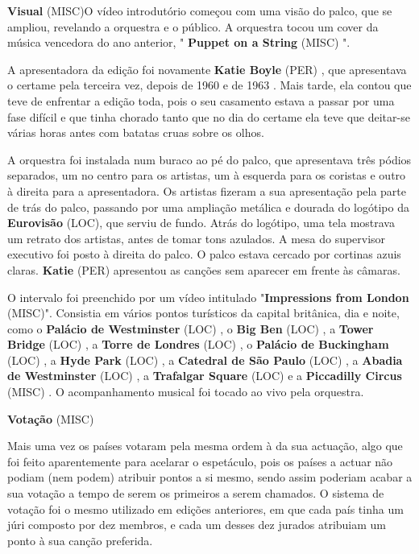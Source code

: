 \documentclass[12pt,a4paper]{article}
\begin{document}
\textbf{Visual} (MISC)O vídeo introdutório começou com uma visão do palco, que se ampliou, revelando a orquestra e o público. A orquestra tocou um cover da música vencedora do ano anterior, " \textbf{Puppet on a String} (MISC) ".

A apresentadora da edição foi novamente \textbf{Katie Boyle} (PER) , que apresentava o certame pela terceira vez, depois de 1960 e de 1963 . Mais tarde, ela contou que teve de enfrentar a edição toda, pois o seu casamento estava a passar por uma fase difícil e que tinha chorado tanto que no dia do certame ela teve que deitar-se várias horas antes com batatas cruas sobre os olhos.

A orquestra foi instalada num buraco ao pé do palco, que apresentava três pódios separados, um no centro para os artistas, um à esquerda para os coristas e outro à direita para a apresentadora. Os artistas fizeram a sua apresentação pela parte de trás do palco, passando por uma ampliação metálica e dourada do logótipo da \textbf{Eurovisão} (LOC), que serviu de fundo. Atrás do logótipo, uma tela mostrava um retrato dos artistas, antes de tomar tons azulados. A mesa do supervisor executivo foi posto à direita do palco. O palco estava cercado por cortinas azuis claras. \textbf{Katie} (PER) apresentou as canções sem aparecer em frente às câmaras.

O intervalo foi preenchido por um vídeo intitulado "\textbf{Impressions from London} (MISC)". Consistia em vários pontos turísticos da capital britânica, dia e noite, como o \textbf{Palácio de Westminster} (LOC) , o \textbf{Big Ben} (LOC) , a \textbf{Tower Bridge} (LOC) , a \textbf{Torre de Londres} (LOC) , o \textbf{Palácio de Buckingham} (LOC) , a \textbf{Hyde Park} (LOC) , a \textbf{Catedral de São Paulo} (LOC) , a \textbf{Abadia de Westminster} (LOC) , a \textbf{Trafalgar Square} (LOC) e a \textbf{Piccadilly Circus} (MISC) . O acompanhamento musical foi tocado ao vivo pela orquestra.



\textbf{Votação} (MISC)

Mais uma vez os países votaram pela mesma ordem à da sua actuação, algo que foi feito aparentemente para acelarar o espetáculo, pois os países a actuar não podiam (nem podem) atribuir pontos a si mesmo, sendo assim poderiam acabar a sua votação a tempo de serem os primeiros a serem chamados. O sistema de votação foi o mesmo utilizado em edições anteriores, em que cada país tinha um júri composto por dez membros, e cada um desses dez jurados atribuiam um ponto à sua canção preferida.
\end{document}
